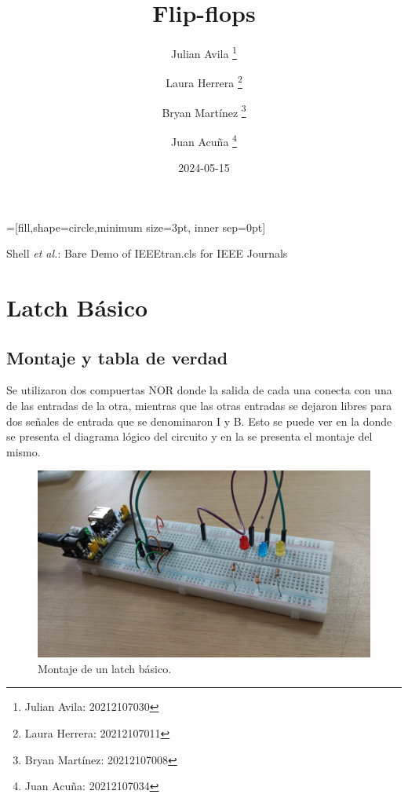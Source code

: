 \documentclass[journal, table]{IEEEtran}
\begin{document}
=[fill,shape=circle,minimum size=3pt, inner sep=0pt]

\title{\textbf{Flip-flops} \\ \small{ }}

\author[*]{Julian Avila
	\thanks{Julian Avila: 20212107030}}
\author[*]{Laura Herrera
	\thanks{Laura Herrera: 20212107011}}
\author[*]{Bryan Martínez
	\thanks{Bryan Martínez: 20212107008}}
\author[*]{Juan Acuña
	\thanks{Juan Acuña: 20212107034}}


\date{2024-05-15}

\markboth{}
{Shell \MakeLowercase{\textit{et al.}}: Bare Demo of IEEEtran.cls for IEEE Journals}

\maketitle

\section{Latch Básico}
\subsection{Montaje y tabla de verdad}
Se utilizaron dos compuertas NOR donde la salida de cada una conecta con una
de las entradas de la otra, mientras que las otras entradas se dejaron libres
para dos señales de entrada que se denominaron I y B. Esto se puede ver en la
 donde se presenta el diagrama lógico del circuito
y en la  se presenta el montaje del mismo.


\begin{figure}[h!]
\centering
\includegraphics[width=0.8\linewidth]{./Images/basic-latch.jpeg}
	\caption{Montaje de un latch básico.}
	\label{fig:basic-latch}
\end{figure}
\end{document}
